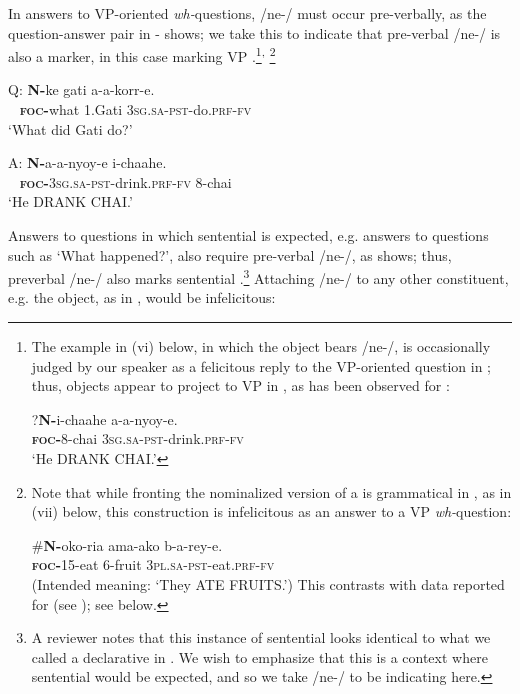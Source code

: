 \documentclass[output=paper,modfonts]{langscibook}
\begin{document}
In answers to VP-oriented \textit{wh-}questions, /ne-/ must occur pre-verbally, as the question-answer pair in - shows; we take this to indicate that pre-verbal /ne-/ is also a  marker, in this case marking VP .\footnote{%
  The example in (vi) below, in which the object bears /ne-/, is occasionally judged by our speaker as a felicitous reply to the VP-oriented question in ; thus, objects appear to project  to VP in , as has been observed for  \citep{Selkirk1984}:

  \ea
  \gll ?\textbf{N-}i-chaahe a-a-nyoy-e.\\
  \textsc{\textbf{foc}}\textbf{-}8-chai \textsc{3sg}.\textsc{sa}-\textsc{pst}-drink.\textsc{prf}-\textsc{fv}\\
  \glt ‘He DRANK CHAI.’
  \zlast
}\textsuperscript{,}%
\footnote{
  Note that while fronting the nominalized version of a  is grammatical in , as in (vii) below, this construction is infelicitous as an answer to a VP \textit{wh-}question:

  \ea
  \gll \#\textbf{N-}oko-ria ama-ako b-a-rey-e.\\
  \textsc{\textbf{foc}}\textbf{-}15-eat 6-fruit \textsc{3pl}.\textsc{sa}-\textsc{pst}-eat.\textsc{prf}-\textsc{fv}\\
  \glt (Intended meaning: ‘They ATE FRUITS.’)
  \z
  This contrasts with data reported for  (see \citealt{Schwarz2007}); see  below.
}

\ea\label{ex:landmann:13}
\gll Q: \textbf{N-}ke gati a-a-korr-e.\\
     ~ \textsc{\textbf{foc}}\textbf{-}what 1.Gati \textsc{3sg}.\textsc{sa}-\textsc{pst}-do.\textsc{prf}-\textsc{fv}\\
\glt ‘What did Gati do?’
\z

\ea\label{ex:landmann:14}
\gll A: \textbf{N-}a-a-nyoy-e i-chaahe.\\
    ~ \textsc{\textbf{foc}}\textbf{-}\textsc{3sg}.\textsc{sa}-\textsc{pst}-drink.\textsc{prf}-\textsc{fv} 8-chai\\
\glt ‘He DRANK CHAI.’
\z

Answers to questions in which sentential  is expected, e.g. answers to questions such as ‘What happened?’, also require pre-verbal /ne-/, as  shows; thus, preverbal /ne-/ also marks sentential .\footnote{A reviewer notes that this instance of sentential  looks identical to what we called a declarative in . We wish to emphasize that this is a context where sentential  would be expected, and so we take /ne-/ to be indicating  here.} Attaching /ne-/ to any other constituent, e.g. the object, as in , would be infelicitous:
\end{document}
